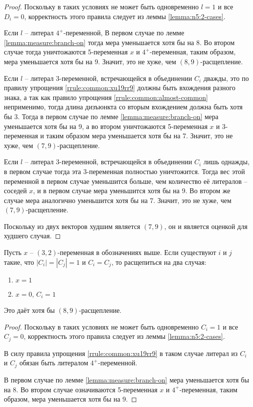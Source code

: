 \begin{proof}
 Поскольку в таких условиях не может быть одновременно $l = 1$ и все $D_i = 0$, корректность этого правила следует из леммы \ref{lemma:n5:2-cases}.

 Если $l$ -- литерал $4^+$-переменной, В первом случае по лемме \ref{lemma:measure:branch-on} тогда мера уменьшается хотя бы на 8. Во втором случае тогда уничтожаются 5-переменная $x$ и $4^+$-переменная, таким образом, мера уменьшается хотя бы на 9. Значит, это не хуже, чем $(8,9)$-расщепление.

 Если $l$ -- литерал 3-переменной, встречающейся в объединении $C_i$ дважды, это по правилу упрощения \ref{rrule:common:xu19rr9} должны быть вхождения разного знака, а так как правило упрощения \ref{rrule:common:almost-common} неприменимо, тогда длина дизъюнкта со вторым вхождением должна быть хотя бы 3. Тогда в первом случае по лемме \ref{lemma:measure:branch-on} мера уменьшается хотя бы на 9, а во втором уничтожаются 5-переменная $x$ и 3-переменная и таким образом мера уменьшается хотя бы на 7. Значит, это не хуже, чем $(7,9)$-расщепление.

 Если $l$ -- литерал 3-переменной, встречающейся в объединении $C_i$ лишь однажды, в первом случае тогда эта 3-переменная полностью уничтожится. Тогда вес этой переменной в первом случае уменьшится больше, чем количество её литералов -- соседей $x$, и в первом случае мера уменьшится хотя бы на 9. Во втором же случае мера аналогично уменьшится хотя бы на 7. Значит, это не хуже, чем $(7,9)$-расщепление.

 Поскольку из двух векторов худшим является $(7,9)$, он и является оценкой для худшего случая.
\end{proof}

\begin{brule}
 Пусть $x$ -- $(3,2)$-переменная в обозначениях выше. Если существуют $i$ и $j$ такие, что $|C_i| = |C_j| = 1$ и $C_i = C_j$, то расщепиться на два случая:

 \begin{enumerate}
  \item $x = 1$
  \item $x = 0$, $C_i = 1$
 \end{enumerate}

 Это даёт хотя бы $(8,9)$-расщепление.
 \label{brule:n5:32-rest:same-c}
\end{brule}

\begin{proof}
 Поскольку в таких условиях не может быть одновременно $C_i = 1$ и все $C_j = 0$, корректность этого правила следует из леммы \ref{lemma:n5:2-cases}.

 В силу правила упрощения \ref{rrule:common:xu19rr9} в таком случае литерал из $C_i$ и $C_j$ обязан быть литералом $4^+$-переменной.

 В первом случае по лемме \ref{lemma:measure:branch-on} мера уменьшается хотя бы на 8. Во втором случае означиваются 5-переменная $x$ и $4^+$-переменная, таким образом, мера уменьшается хотя бы на 9.
\end{proof}

